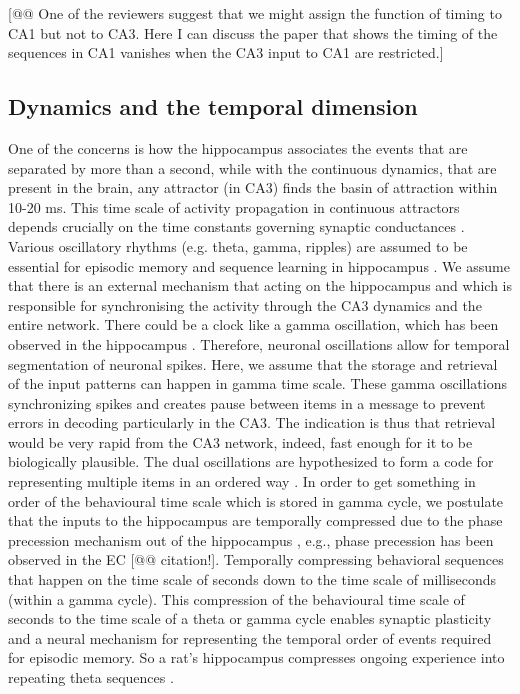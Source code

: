 \documentclass[utf8]{frontiersSCNS} %
\begin{document}
[@@ One of the reviewers suggest that we might assign the function of timing to CA1 but not to CA3. Here I can discuss the paper that shows the timing of the sequences in CA1 vanishes when the CA3 input to CA1 are restricted.] 

\subsection{Dynamics and the temporal dimension}  

One of the concerns is how the hippocampus associates the events that are separated by more than a second, while with the continuous dynamics, that are present in the brain, any attractor (in CA3) finds the basin of attraction within 10-20 ms. This time scale of activity propagation in continuous attractors depends crucially on the time constants governing synaptic conductances \citep{battaglia1998rapid, panzeri2001speed, treves1993mean}. 
%
Various oscillatory rhythms (e.g. theta, gamma, ripples) are assumed to be essential for episodic memory and sequence learning in hippocampus \citep{traub2002axonal}.
%
We assume that there is an external mechanism that acting on the hippocampus and which is responsible for synchronising the activity through the CA3 dynamics and the entire network. There could be a clock like a gamma oscillation, which has been observed in the hippocampus \citep{jensen2007human}. Therefore, neuronal oscillations allow for temporal segmentation of neuronal spikes. 
%
Here, we assume that the storage and retrieval of the input patterns can happen in gamma time scale.
%
These gamma oscillations synchronizing spikes and creates pause between items in a message to prevent errors in decoding particularly in the CA3. 
%
The indication is thus that retrieval would be very rapid from the CA3 network, indeed, fast enough for it to be biologically plausible.
%
The dual oscillations are hypothesized to form a code for representing multiple items in an ordered way \citep{jensen1996hippocampal, lisman1995storage}. 
%
In order to get something in order of the behavioural time scale which is stored in gamma cycle, we postulate that the inputs to the hippocampus are temporally compressed due to the phase precession mechanism out of the hippocampus \citep{o1993phase}, e.g., phase precession has been observed in the EC [@@ citation!]. 
%
Temporally compressing behavioral sequences that happen on the time scale of seconds down to the time scale of milliseconds (within a gamma cycle). This compression of the behavioural time scale of seconds to the time scale of a theta or gamma cycle enables synaptic plasticity and a neural mechanism for representing the temporal order of events required for episodic memory. So a rat's hippocampus compresses ongoing experience into repeating theta sequences \citep{senior2008gamma, lisman2013theta, siegel2009phase}.
\end{document}
